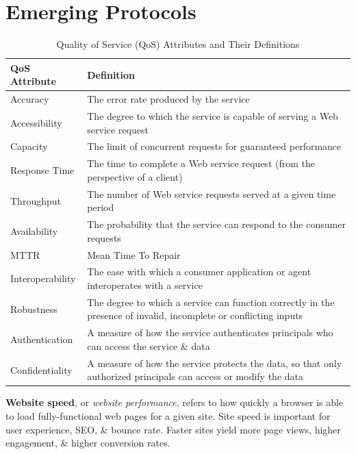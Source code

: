 \documentclass[a4paper,11pt]{article}
\begin{document}
\section{Emerging Protocols}
\begin{table}[H]
    \centering
    \renewcommand{\arraystretch}{1.3}
    \begin{tabular}{|p{4cm}|p{11cm}|}
        \hline
        \textbf{QoS Attribute} & \textbf{Definition} \\
        \hline
        Accuracy & The error rate produced by the service \\
        \hline
        Accessibility & The degree to which the service is capable of serving a Web service request \\
        \hline
        Capacity & The limit of concurrent requests for guaranteed performance \\
        \hline
        Response Time & The time to complete a Web service request (from the perspective of a client) \\
        \hline
        Throughput & The number of Web service requests served at a given time period \\
        \hline
        Availability & The probability that the service can respond to the consumer requests \\
        \hline
        MTTR & Mean Time To Repair \\
        \hline
        Interoperability & The ease with which a consumer application or agent interoperates with a service \\
        \hline
        Robustness & The degree to which a service can function correctly in the presence of invalid, incomplete or conflicting inputs \\
        \hline
        Authentication & A measure of how the service authenticates principals who can access the service \& data \\
        \hline
        Confidentiality & A measure of how the service protects the data, so that only authorized principals can access or modify the data \\
        \hline
    \end{tabular}
    \caption{Quality of Service (QoS) Attributes and Their Definitions}
\end{table}

\textbf{Website speed}, or \textit{website performance}, refers to how quickly a browser is able to load fully-functional web pages for a given site.
Site speed is important for user experience, SEO, \& bounce rate.
Faster sites yield more page views, higher engagement, \& higher conversion rates.
\end{document}
